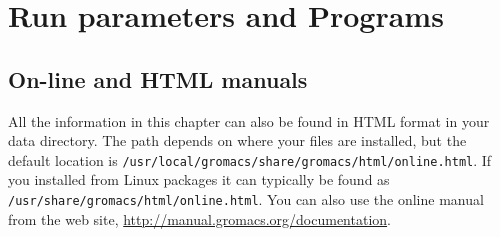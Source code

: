 %
%
%
%
%
%
%

\chapter{Run parameters and Programs}
\label{ch:programs}

\section{On-line and HTML manuals}
All the information in this chapter can also be found in HTML
format in your {\gromacs} data directory. The path depends on
where your files are installed, but the default location is
{\tt /usr/local/gromacs/share/gromacs/html/online.html}.
If you installed from Linux packages it can typically be found as
{\tt /usr/share/gromacs/html/online.html}.
You can also use the online manual from the {\gromacs} web site,
\url{http://manual.gromacs.org/documentation}.

